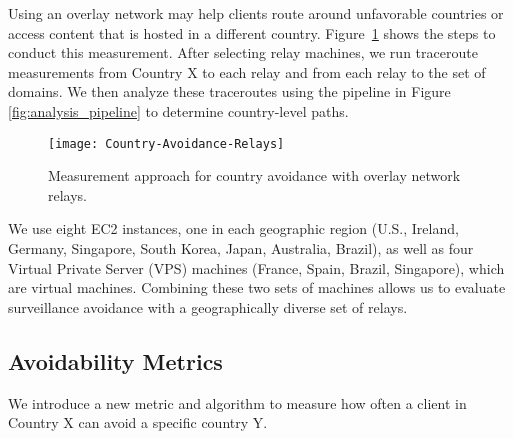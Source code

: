 Using an overlay network may
help clients route around unfavorable countries or access content 
that is hosted in a different country.  Figure~\ref{fig:avoidance_relays}
shows the steps to conduct this measurement. 
After selecting relay machines, we run traceroute measurements from
Country X to each relay and from each relay to the set of domains. We
then analyze these traceroutes using the pipeline in Figure
\ref{fig:analysis_pipeline} to determine country-level paths. 

\begin{figure}[t]
\centering
\texttt{[image: Country-Avoidance-Relays]}
\caption{Measurement approach for country avoidance with overlay network relays.}
\label{fig:avoidance_relays}
\end{figure}

We use eight EC2 instances, one in each geographic region
(U.S., Ireland, Germany, Singapore, South Korea, Japan, Australia,
Brazil), as well as four Virtual Private Server (VPS) machines (France,
Spain, Brazil, Singapore), which are virtual machines.
Combining these two sets of machines allows us to evaluate surveillance avoidance with a geographically diverse set of relays. 

\subsection{Avoidability Metrics}
\label{metrics}

We introduce a new metric and algorithm to measure how often a client in
Country X can avoid a specific country Y.  

